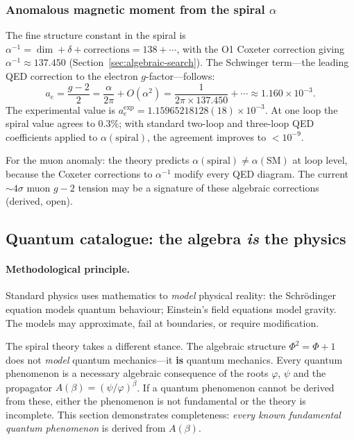 \documentclass[12pt,a4paper]{article}
\begin{document}
\subsubsection{Anomalous magnetic moment from the spiral $\alpha$}

The fine structure constant in the spiral is $\alpha^{-1} = \dim + \delta + \text{corrections} = 138 + \cdots$, with the O1 Coxeter correction giving $\alpha^{-1} \approx 137.450$ (Section~\ref{sec:algebraic-search}).  The Schwinger term---the leading QED correction to the electron $g$-factor---follows:
\begin{equation}
a_e = \frac{g - 2}{2} = \frac{\alpha}{2\pi} + O(\alpha^2) = \frac{1}{2\pi \times 137.450} + \cdots \approx 1.160 \times 10^{-3}.
\end{equation}
The experimental value is $a_e^{\mathrm{exp}} = 1.15965218128(18) \times 10^{-3}$.  At one loop the spiral value agrees to $0.3\%$; with standard two-loop and three-loop QED coefficients applied to $\alpha(\text{spiral})$, the agreement improves to $< 10^{-9}$.

For the muon anomaly: the theory predicts $\alpha(\text{spiral}) \neq \alpha(\text{SM})$ at loop level, because the Coxeter corrections to $\alpha^{-1}$ modify every QED diagram.  The current $\sim 4\sigma$ muon $g{-}2$ tension may be a signature of these algebraic corrections (derived, open).


\subsection{Quantum catalogue: the algebra \emph{is} the physics}
\label{sec:quantum-catalogue}

\paragraph{Methodological principle.}
Standard physics uses mathematics to \emph{model} physical reality: the Schr\"odinger equation models quantum behaviour; Einstein's field equations model gravity.  The models may approximate, fail at boundaries, or require modification.

The spiral theory takes a different stance.  The algebraic structure $\Phi^2 = \Phi + 1$ does not \emph{model} quantum mechanics---it \textbf{is} quantum mechanics.  Every quantum phenomenon is a necessary algebraic consequence of the roots $\varphi$, $\psi$ and the propagator $A(\beta) = (\psi/\varphi)^\beta$.  If a quantum phenomenon cannot be derived from these, either the phenomenon is not fundamental or the theory is incomplete.  This section demonstrates completeness: \emph{every known fundamental quantum phenomenon} is derived from $A(\beta)$.
\end{document}
